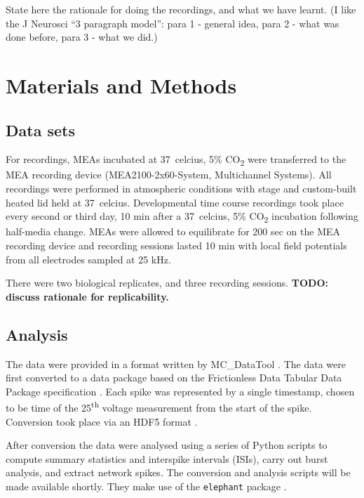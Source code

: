 \documentclass[11pt]{article}
\begin{document}
{State here the rationale for doing the recordings, and what we have
learnt.  (I like the J Neurosci ``3 paragraph model'': para 1 -
general idea, para 2 - what was done before, para 3 - what we did.)
\section*{Materials and Methods}


\subsection*{Data sets}

For recordings, MEAs incubated at \SI{37}{celcius}, 5\%
CO\textsubscript{2} were transferred to the MEA recording device
(MEA2100-2x60-System, Multichannel Systems). All recordings were
performed in atmospheric conditions with stage and custom-built heated
lid held at \SI{37}{celcius}. Developmental time course recordings took
place every second or third day, 10 min after a \SI{37}{celcius}, 5\%
CO\textsubscript{2} incubation following half-media change. MEAs were
allowed to equilibrate for 200 sec on the MEA recording device and
recording sessions lasted 10 min with local field potentials from all
electrodes sampled at 25 kHz.

\par There were two biological replicates, and three recording
sessions.  \textbf{TODO: discuss rationale for replicability.}

\subsection*{Analysis}






\par The data were provided in a format written by MC\_DataTool \cite{Systems2014-tw}. The data were first converted to a data package based on the Frictionless Data Tabular Data Package specification \cite{Walsh2017-nm}. Each spike was represented by a single timestamp, chosen to be time of the 25\textsuperscript{th} voltage measurement from the start of the spike. Conversion took place via an HDF5 format \cite{Eglen2014}.

\par After conversion the data were analysed using a series of Python scripts to compute summary statistics and interspike intervals (ISIs), carry out burst analysis, and extract network spikes. The conversion and analysis scripts will be made available shortly. They make use of the \texttt{elephant} package \cite{elephant_toolkit}.

}
\end{document}
